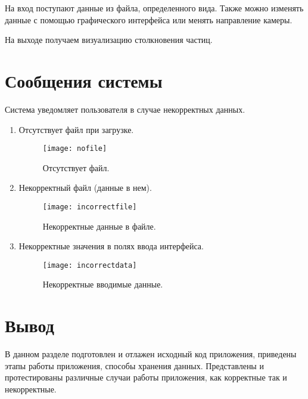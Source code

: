 На вход поступают данные из файла, определенного вида. Также можно изменять данные с помощью графического интерфейса или менять направление камеры. 

На выходе получаем визуализацию столкновения частиц. 


\section{\textbf{Сообщения  системы }}

Система уведомляет пользователя в случае некорректных данных. 

\begin{enumerate}
	\item Отсутствует файл при загрузке. 
	\begin{figure}[H]
		\centering
		\texttt{[image: nofile]}
		\caption{Отсутствует файл. }
		\label{img:nofile}
	\end{figure}
	\item Некорректный файл (данные в нем). 
	\begin{figure}[H]
		\centering
		\texttt{[image: incorrectfile]}
		\caption{Некорректные данные в файле. }
		\label{img:incorrectfile}
	\end{figure}
	\item Некорректные значения в полях ввода интерфейса. 
	\begin{figure}[H]
		\centering
		\texttt{[image: incorrectdata]}
		\caption{Некорректные вводимые данные. }
		\label{img:incorrectdata}
	\end{figure}
\end{enumerate}

\section{\textbf{Вывод}}

В данном разделе подготовлен и отлажен исходный код приложения, приведены этапы работы приложения, способы хранения данных. Представлены и протестированы различные случаи работы приложения, как корректные так и некорректные. 
